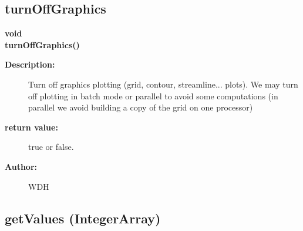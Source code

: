 \subsection{turnOffGraphics}
 
\newlength{\GenericGraphicsInterfaceIncludeArgIndent}
\begin{flushleft} \textbf{%
void   \\ 
\settowidth{\GenericGraphicsInterfaceIncludeArgIndent}{turnOffGraphics(}%
turnOffGraphics()
}\end{flushleft}
\begin{description}
\item[{\bf Description:}] 
   Turn off graphics plotting (grid, contour, streamline... plots). We may turn off plotting in
 batch mode or parallel to avoid some computations (in parallel we avoid
 building a copy of the grid on one processor)

\item[{\bf return value:}]  true or false.
\item[{\bf Author:}]  WDH
\end{description}
\subsection{getValues (IntegerArray)}
 
